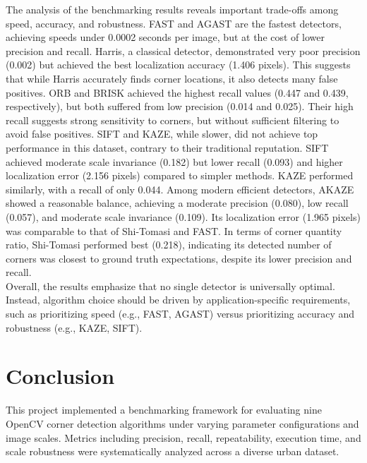 \documentclass[journal]{IEEEtran}
\begin{document}
The analysis of the benchmarking results reveals important trade-offs among speed, accuracy, and robustness. FAST and AGAST are the fastest detectors, achieving speeds under 0.0002 seconds per image, but at the cost of lower precision and recall. Harris, a classical detector, demonstrated very poor precision (0.002) but achieved the best localization accuracy (1.406 pixels). This suggests that while Harris accurately finds corner locations, it also detects many false positives. ORB and BRISK achieved the highest recall values (0.447 and 0.439, respectively), but both suffered from low precision (0.014 and 0.025). Their high recall suggests strong sensitivity to corners, but without sufficient filtering to avoid false positives. SIFT and KAZE, while slower, did not achieve top performance in this dataset, contrary to their traditional reputation. SIFT achieved moderate scale invariance (0.182) but lower recall (0.093) and higher localization error (2.156 pixels) compared to simpler methods. KAZE performed similarly, with a recall of only 0.044. Among modern efficient detectors, AKAZE showed a reasonable balance, achieving a moderate precision (0.080), low recall (0.057), and moderate scale invariance (0.109). Its localization error (1.965 pixels) was comparable to that of Shi-Tomasi and FAST. In terms of corner quantity ratio, Shi-Tomasi performed best (0.218), indicating its detected number of corners was closest to ground truth expectations, despite its lower precision and recall.\\

Overall, the results emphasize that no single detector is universally optimal. Instead, algorithm choice should be driven by application-specific requirements, such as prioritizing speed (e.g., FAST, AGAST) versus prioritizing accuracy and robustness (e.g., KAZE, SIFT).\\



\section{Conclusion}
\label{section:conclusion}

This project implemented a benchmarking framework for evaluating nine OpenCV corner detection algorithms under varying parameter configurations and image scales. Metrics including precision, recall, repeatability, execution time, and scale robustness were systematically analyzed across a diverse urban dataset.
\end{document}
